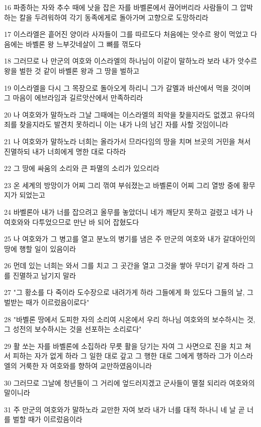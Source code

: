 \par 16 파종하는 자와 추수 때에 낫을 잡은 자를 바벨론에서 끊어버리라 사람들이 그 압박하는 칼을 두려워하여 각기 동족에게로 돌아가며 고향으로 도망하리라
\par 17 이스라엘은 흩어진 양이라 사자들이 그를 따르도다 처음에는 앗수르 왕이 먹었고 다음에는 바벨론 왕 느부갓네살이 그 뼈를 꺾도다
\par 18 그러므로 나 만군의 여호와 이스라엘의 하나님이 이같이 말하노라 보라 내가 앗수르 왕을 벌한 것 같이 바벨론 왕과 그 땅을 벌하고
\par 19 이스라엘을 다시 그 목장으로 돌아오게 하리니 그가 갈멜과 바산에서 먹을 것이며 그 마음이 에브라임과 길르앗산에서 만족하리라
\par 20 나 여호와가 말하노라 그날 그때에는 이스라엘의 죄악을 찾을지라도 없겠고 유다의 죄를 찾을지라도 발견치 못하리니 이는 내가 나의 남긴 자를 사할 것임이니라
\par 21 나 여호와가 말하노라 너희는 올라가서 므라다임의 땅을 치며 브곳의 거민을 쳐서 진멸하되 내가 너희에게 명한 대로 다하라
\par 22 그 땅에 싸움의 소리와 큰 파멸의 소리가 있으리라
\par 23 온 세계의 방망이가 어찌 그리 꺾여 부숴졌는고 바벨론이 어찌 그리 열방 중에 황무지가 되었는고
\par 24 바벨론아 내가 너를 잡으려고 올무를 놓았더니 네가 깨닫지 못하고 걸렸고 네가 나 여호와와 다투었으므로 만난 바 되어 잡혔도다
\par 25 나 여호와가 그 병고를 열고 분노의 병기를 냄은 주 만군의 여호와 내가 갈대아인의 땅에 행할 일이 있음이라
\par 26 먼데 있는 너희는 와서 그를 치고 그 곳간을 열고 그것을 쌓아 무더기 같게 하라 그를 진멸하고 남기지 말라
\par 27 "그 황소를 다 죽이라 도수장으로 내려가게 하라 그들에게 화 있도다 그들의 날, 그 벌받는 때가 이르렀음이로다"
\par 28 "바벨론 땅에서 도피한 자의 소리여 시온에서 우리 하나님 여호와의 보수하시는 것, 그 성전의 보수하시는 것을 선포하는 소리로다"
\par 29 활 쏘는 자를 바벨론에 소집하라 무릇 활을 당기는 자여 그 사면으로 진을 치고 쳐서 피하는 자가 없게 하라 그 일한 대로 갚고 그 행한 대로 그에게 행하라 그가 이스라엘의 거룩한 자 여호와를 향하여 교만하였음이니라
\par 30 그러므로 그날에 청년들이 그 거리에 엎드러지겠고 군사들이 멸절 되리라 여호와의 말이니라
\par 31 주 만군의 여호와가 말하노라 교만한 자여 보라 내가 너를 대적 하나니 네 날 곧 너를 벌할 때가 이르렀음이라
